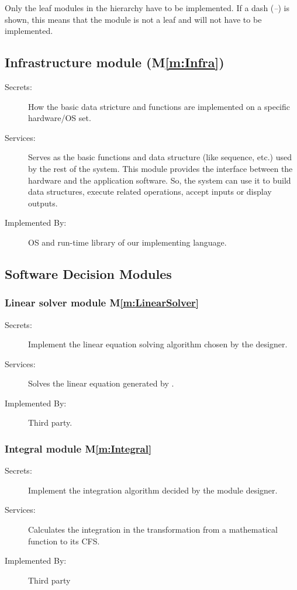 \documentclass[12pt, titlepage]{article}
\newcommand{\mref}[1]{M\ref{m:#1}}
\begin{document}
Only the leaf modules in the hierarchy have to be implemented. If a dash
(\emph{--}) is shown, this means that the module is not a leaf and will not have
to be implemented.

\subsection{Infrastructure module (\mref{Infra})}

\begin{description}
\item[Secrets:]How the basic data stricture  and functions are
  implemented on a specific hardware/OS set.
\item[Services:]Serves as the basic functions and data structure (like sequence,
  etc.) used by the rest of the system. This module provides the interface
  between the hardware and the application software. So, the system can use it
  to build data structures, execute related operations, accept inputs or display
  outputs.
\item[Implemented By:] OS and run-time library of our implementing language.
\end{description}
\subsection{Software Decision Modules}
\subsubsection{Linear solver module \mref{LinearSolver}}

\begin{description}
\item[Secrets:]Implement the linear equation solving algorithm chosen by the designer.
\item[Services:]Solves the linear equation generated by \progname.
\item[Implemented By:] Third party.
\end{description}
\subsubsection{Integral module \mref{Integral}}

\begin{description}
	\item[Secrets:]Implement the integration algorithm decided by the module designer.
	\item[Services:]Calculates the integration in the transformation from a mathematical function to its CFS.
	\item[Implemented By:] Third party
\end{description}
\end{document}
